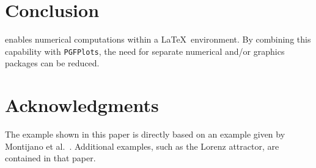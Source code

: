 \documentclass[nofontspec,grid,colorlinks,nofoot]{asmeconf}
\begin{document}

\section{Conclusion}
 enables numerical computations within a \LaTeX\ environment. By combining this capability with
\texttt{PGFPlots}, the need for separate numerical and/or graphics packages can be reduced.


\section*{Acknowledgments}
The example shown in this paper is directly based on an example given by Montijano et al.~\cite{montijano2014}. Additional examples, such as the
Lorenz attractor, are contained in that paper.




\end{document}
